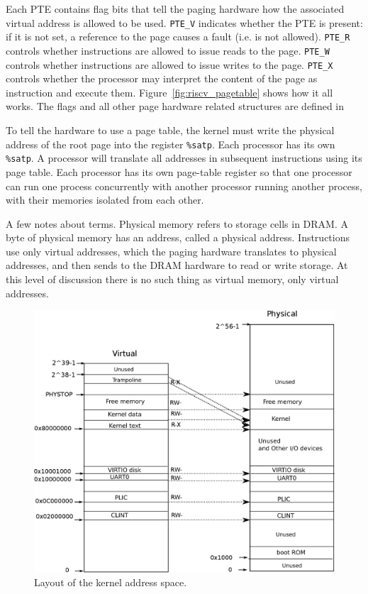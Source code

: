 Each PTE contains flag bits that tell the paging hardware
how the associated virtual address is allowed to be used.
\lstinline{PTE_V}
indicates whether the PTE is present: if it is
not set, a reference to the page causes a fault (i.e. is not allowed).
\lstinline{PTE_R}
controls whether instructions are allowed to issue
reads to the page.
\lstinline{PTE_W}
controls whether instructions are allowed to issue
writes to the page.
\lstinline{PTE_X}
controls whether the processor may interpret the content
of the page as instruction and execute them.
Figure~\ref{fig:riscv_pagetable}
shows how it all works.
The flags and all other page hardware related structures are defined in

To tell the hardware to use a page table, the kernel must
write the physical address of the root page into the register
\texttt{\%satp}.
Each processor has its own
\texttt{\%satp}.
A processor will translate all addresses in subsequent instructions
using its page table.
Each processor has its own page-table register so that one processor
can run one process concurrently with another processor running
another process, with their memories isolated from each other.

A few notes about terms.
Physical memory refers to storage cells in DRAM.
A byte of physical memory has an address, called a physical address.
Instructions use only virtual addresses, which the
paging hardware translates to physical addresses, and then
sends to the DRAM hardware to read or write storage.
At this level of discussion there is no such thing as virtual memory,
only virtual addresses.

\begin{figure}[t]
\center
\includegraphics[scale=0.5]{fig/xv6_layout.eps}
\caption{Layout of the kernel address space.}
\label{fig:xv6_layout}
\end{figure}
